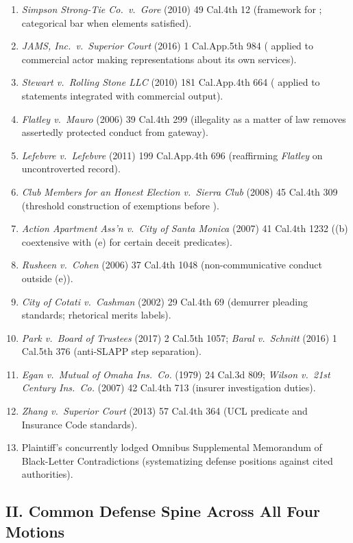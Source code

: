 \begin{enumerate}
\tightlist
\item \textit{Simpson Strong-Tie Co.\ v.\ Gore} (2010) 49 Cal.4th 12 (framework for ; categorical bar when elements satisfied).
\item \textit{JAMS, Inc.\ v.\ Superior Court} (2016) 1 Cal.App.5th 984 ( applied to commercial actor making representations about its own services).
\item \textit{Stewart v.\ Rolling Stone LLC} (2010) 181 Cal.App.4th 664 ( applied to statements integrated with commercial output).
\item \textit{Flatley v.\ Mauro} (2006) 39 Cal.4th 299 (illegality as a matter of law removes assertedly protected conduct from  gateway).
\item \textit{Lefebvre v.\ Lefebvre} (2011) 199 Cal.App.4th 696 (reaffirming \textit{Flatley} on uncontroverted record).
\item \textit{Club Members for an Honest Election v.\ Sierra Club} (2008) 45 Cal.4th 309 (threshold construction of  exemptions before ).
\item \textit{Action Apartment Ass'n v.\ City of Santa Monica} (2007) 41 Cal.4th 1232 ((b) coextensive with (e) for certain deceit predicates).
\item \textit{Rusheen v.\ Cohen} (2006) 37 Cal.4th 1048 (non-communicative conduct outside (e)).
\item \textit{City of Cotati v.\ Cashman} (2002) 29 Cal.4th 69 (demurrer pleading standards; rhetorical merits labels).
\item \textit{Park v.\ Board of Trustees} (2017) 2 Cal.5th 1057; \textit{Baral v.\ Schnitt} (2016) 1 Cal.5th 376 (anti-SLAPP step separation).
\item \textit{Egan v.\ Mutual of Omaha Ins.\ Co.} (1979) 24 Cal.3d 809; \textit{Wilson v.\ 21st Century Ins.\ Co.} (2007) 42 Cal.4th 713 (insurer investigation duties).
\item \textit{Zhang v.\ Superior Court} (2013) 57 Cal.4th 364 (UCL predicate and Insurance Code standards).
\item Plaintiff's concurrently lodged Omnibus Supplemental Memorandum of Black-Letter Contradictions (systematizing defense positions against cited authorities).
\end{enumerate}

\subsection*{II. Common Defense Spine Across All Four Motions}

